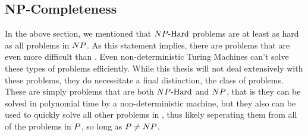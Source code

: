 \subsection{NP-Completeness}
In the above section, we mentioned that ${NP\text{-Hard{}}}$ problems are at least as hard as all problems in ${NP}{}$. As this statement implies, there are problems that are even more difficult than \np{}. Even non-deterministic Turing Machines can't solve these types of problems efficiently. While this thesis will not deal extensively with these problems, they do necessitate a final distinction, the \textit{\textbf{\npc{}}} class of problems. These are simply problems that are both ${NP\text{-Hard{}}}$ and ${NP}{}$, that is they can be solved in polynomial time by a non-deterministic machine, but they also can be used to quickly solve all other problems in \np{}, thus likely seperating them from all of the problems in ${P}{}$, so long as ${P}{} \neq {NP}{}$.

